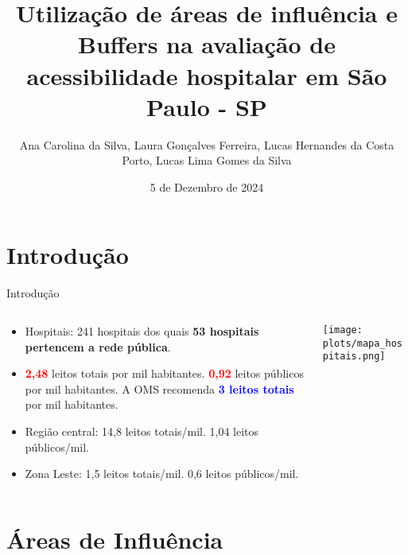 \documentclass{beamer}
\title{Utilização de áreas de influência e Buffers na avaliação de acessibilidade hospitalar em São Paulo - SP}
\author{Ana Carolina da Silva, Laura Gonçalves Ferreira,  Lucas Hernandes da Costa Porto, Lucas Lima Gomes da Silva}
\institute{Universidade de São Paulo}
\date{5 de Dezembro de 2024} %
\begin{document}
\begin{frame}
    \titlepage
\end{frame}


\section{Introdução}
\begin{frame}{Introdução}
    \begin{columns}
        \begin{column}{0.6\textwidth}
            \begin{itemize}
                \item Hospitais: 241 hospitais dos quais \textbf{53 hospitais pertencem a rede pública}.
                \item \textbf{\textcolor{red}{2,48}} leitos totais por mil habitantes. \textbf{\textcolor{red}{0,92}} leitos públicos por mil habitantes. A OMS recomenda \textbf{\textcolor{blue}{3 leitos totais}} por mil habitantes.
                \item Região central: 14,8 leitos totais/mil. 1,04 leitos públicos/mil.
                \item Zona Leste: 1,5 leitos totais/mil. 0,6 leitos públicos/mil.
            \end{itemize}
        \end{column}

        \begin{column}{0.4\textwidth}
            \centering
            \texttt{[image: plots/mapa\_hospitais.png]} 
        \end{column}
    \end{columns}
\end{frame}


\section{Áreas de Influência}
\end{document}
